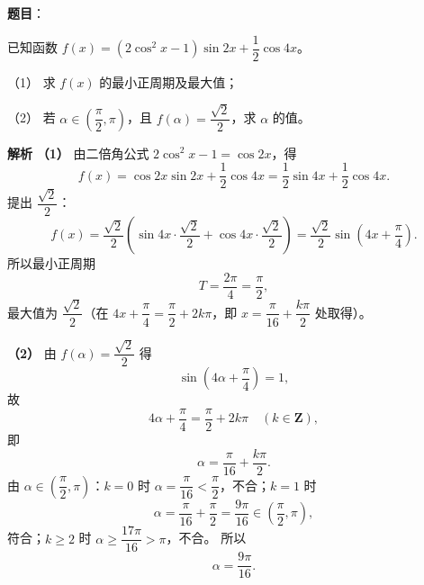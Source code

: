 \begin{answer}

\textbf{题目}：

已知函数 $f(x)=(2\cos^2x-1)\sin2x+\dfrac12\cos4x$。

（1） 求 $f(x)$ 的最小正周期及最大值；

（2） 若 $\alpha\in\left(\dfrac{\pi}2,\pi\right)$，且 $f(\alpha)=\dfrac{\sqrt2}2$，求 $\alpha$ 的值。

\textbf{解析}
\textbf{（1）} 由二倍角公式 $2\cos^2x-1=\cos2x$，得
\nopagebreak[4]
\[f(x)=\cos2x\sin2x+\frac12\cos4x=\frac12\sin4x+\frac12\cos4x.\]
提出 $\dfrac{\sqrt2}2$：
\nopagebreak[4]
\[f(x)=\frac{\sqrt2}2\left(\sin4x\cdot\frac{\sqrt2}2+\cos4x\cdot\frac{\sqrt2}2\right)
=\frac{\sqrt2}2\sin\left(4x+\frac{\pi}4\right).\]
所以最小正周期
\nopagebreak[4]
\[T=\frac{2\pi}4=\frac{\pi}2,\]
最大值为 $\dfrac{\sqrt2}2$（在 $4x+\dfrac{\pi}4=\dfrac{\pi}2+2k\pi$，即 $x=\dfrac{\pi}{16}+\dfrac{k\pi}2$ 处取得）。

\textbf{（2）} 由 $f(\alpha)=\dfrac{\sqrt2}2$ 得
\nopagebreak[4]
\[\sin\left(4\alpha+\frac{\pi}4\right)=1,\]
故
\nopagebreak[4]
\[4\alpha+\frac{\pi}4=\frac{\pi}2+2k\pi\quad(k\in\mathbf Z),\]
即
\nopagebreak[4]
\[\alpha=\frac{\pi}{16}+\frac{k\pi}2.\]
由 $\alpha\in\left(\dfrac{\pi}2,\pi\right)$：$k=0$ 时 $\alpha=\dfrac{\pi}{16}<\dfrac{\pi}2$，不合；$k=1$ 时
\nopagebreak[4]
\[\alpha=\frac{\pi}{16}+\frac{\pi}2=\frac{9\pi}{16}\in\left(\frac{\pi}2,\pi\right),\]
符合；$k\geqslant2$ 时 $\alpha\geqslant\dfrac{17\pi}{16}>\pi$，不合。
所以
\nopagebreak[4]
\[\alpha=\frac{9\pi}{16}.\]



\end{answer}
